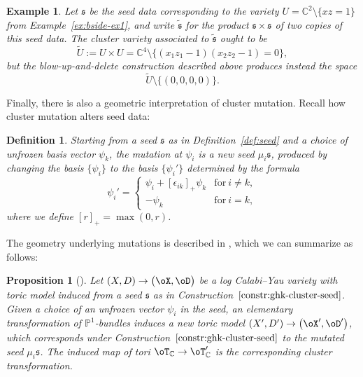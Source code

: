 \documentclass[pdftex]{sigma}%
\numberwithin{equation}{section}
\newtheorem{Proposition}[Theorem]{Proposition}
\newtheorem{Definition}[Theorem]{Definition}
\newtheorem{Example}[Theorem]{Example}
\def\CC{\mathbb{C}}
\def\PP{\mathbb{P}}
\newcommand\frs{\mathfrak{s}}
\begin{document}
\begin{Example}\label{ex:nontruncated}
 Let $\frs$ be the seed data corresponding to the variety $U=\CC^2\setminus \{xz=1\}$ from Example~\ref{ex:bside-ex1}, and write $\widetilde{\frs}$ for the product $\frs\times \frs$ of two copies of this seed data. The cluster variety associated to $\widetilde{\frs}$ ought to be
 \[
 \widetilde{U}:=U\times U = \CC^4\setminus \{(x_1z_1-1)(x_2z_2-1)=0\},
 \]
 but the blow-up-and-delete construction described above produces instead the space
 \[
 \widetilde{U} \setminus \{(0,0,0,0)\}.
 \]
\end{Example}

Finally, there is also a geometric interpretation of cluster mutation. Recall how cluster mutation alters seed data:

\begin{Definition}\label{def:mutation}
 Starting from a seed $\frs$ as in Definition~\ref{def:seed} and a choice of unfrozen basis vector $\psi_k$, the {\em mutation at $\psi_i$} is a new seed $\mu_i\frs$, produced by changing the basis $\{\psi_i\}$ to the basis $\{\psi_i'\}$ determined by the formula
 \[
 \psi_i' = \begin{cases}
 \psi_i + [\epsilon_{ik}]_+\psi_k & \text{for}\ i\neq k,
 \\
 -\psi_k & \text{for}\ i=k,
 \end{cases}
 \]
 where we define $[r]_+ = \max(0,r)$.
\end{Definition}

The geometry underlying mutations is described in \cite[Section 3.1]{GHK2}, which we can summarize as follows:
\begin{Proposition}[{\cite{GHK2}}]\label{prop:bside-mut}
 Let $(X,D)\to \big(\oX,\oD\big)$ be a log Calabi--Yau variety with toric model induced from a seed $\frs$ as in Construction~$\ref{constr:ghk-cluster-seed}$. Given a choice of an unfrozen vector $\psi_i$ in the seed, an elementary transformation of $\PP^1$-bundles induces a new toric model $(X',D')\to \big(\oX',\oD'\big)$, which corresponds under Construction~$\ref{constr:ghk-cluster-seed}$ to the mutated seed $\mu_i\frs$. The induced map of tori $\oT_\CC\to\oT_\CC'$ is the corresponding cluster transformation.
\end{Proposition}
\end{document}
